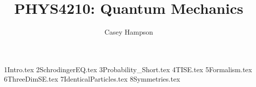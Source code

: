 \documentclass[titlepage]{article}
\title{PHYS4210: Quantum Mechanics}
\author{Casey Hampson}
\begin{document}
    \maketitle
    \pagebreak

    {1Intro.tex}
    {2SchrodingerEQ.tex}
    {3Probability_Short.tex}
    {4TISE.tex}
    {5Formalism.tex}
    {6ThreeDimSE.tex}
    {7IdenticalParticles.tex}
    {8Symmetries.tex}
\end{document}
